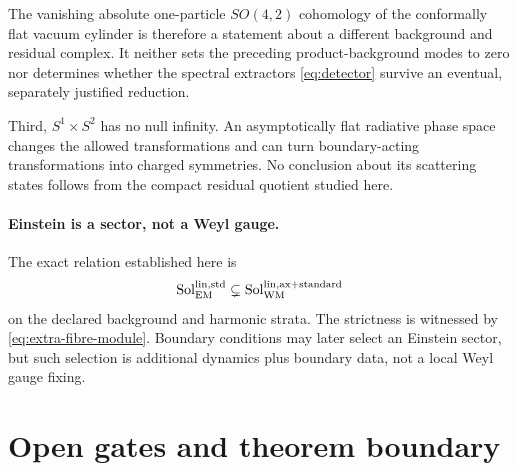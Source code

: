 \documentclass[11pt]{article}
\theoremstyle{remark}
\newcommand{\Sol}{\operatorname{Sol}}
\begin{document}
The vanishing absolute one-particle $SO(4,2)$ cohomology of the conformally
flat vacuum cylinder is therefore a statement about a different background
and residual complex. It neither sets the preceding product-background modes
to zero nor determines whether the spectral extractors
\eqref{eq:detector} survive an eventual, separately justified reduction.

Third, $S^1\times S^2$ has no null infinity. An asymptotically flat radiative
phase space changes the allowed transformations and can turn boundary-acting
transformations into charged symmetries. No conclusion about its scattering
states follows from the compact residual quotient studied here.

\paragraph{Einstein is a sector, not a Weyl gauge.}
The exact relation established here is
\begin{equation}
 \Sol_{\rm EM}^{\rm lin,std}
 \subsetneq \Sol_{\rm WM}^{\rm lin,ax+standard}
\end{equation}
on the declared background and harmonic strata. The strictness is witnessed
by \eqref{eq:extra-fibre-module}. Boundary conditions may later select an Einstein
sector, but such selection is additional dynamics plus boundary data, not a
local Weyl gauge fixing.

\section{Open gates and theorem boundary}\label{sec:open}
\end{document}
